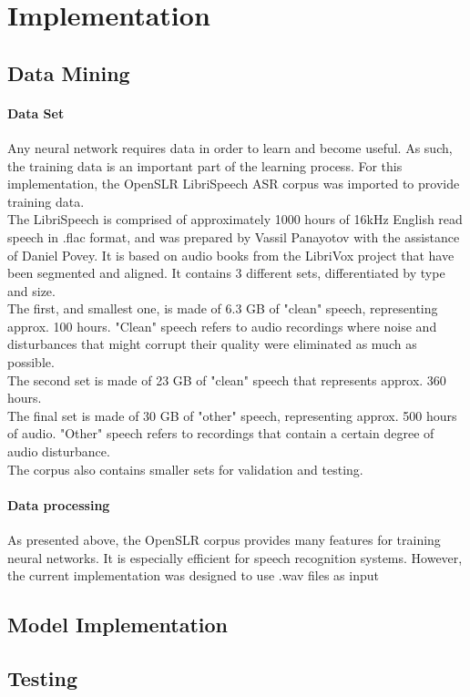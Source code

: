 \chapter{Implementation}\label{ch:implementation}

\section{Data Mining}
\subsubsection{Data Set}
Any neural network requires data in order to learn and become useful. As such, the training data is an important part of the learning process. For this implementation, the OpenSLR LibriSpeech ASR corpus was imported to provide training data.\\

The LibriSpeech is comprised of approximately 1000 hours of 16kHz English read speech in .flac format, and was prepared by Vassil Panayotov with the assistance of Daniel Povey. It is based on audio books from the LibriVox project that have been segmented and aligned. It contains 3 different sets, differentiated by type and size.\\ 
The first, and smallest one, is made of 6.3 GB of "clean" speech, representing approx. 100 hours. "Clean" speech refers to audio recordings where noise and disturbances that might corrupt their quality were eliminated as much as possible.\\ 
The second set is made of 23 GB of "clean" speech that represents approx. 360 hours.\\
The final set is made of 30 GB of "other" speech, representing approx. 500 hours of audio. "Other" speech refers to recordings that contain a certain degree of audio disturbance.\\
The corpus also contains smaller sets for validation and testing.\\

\subsubsection{Data processing}
As presented above, the OpenSLR corpus provides many features for training neural networks. It is especially efficient for speech recognition systems. However, the current implementation was designed to use .wav files as input
\section{Model Implementation}

\section{Testing}
